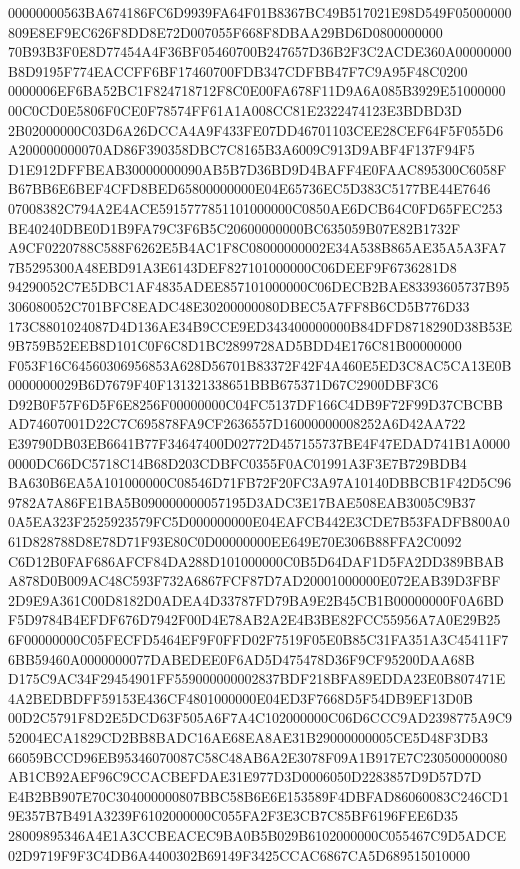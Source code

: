 \documentclass[UTF8,fontset=fandol,zihao=-4,a4paper]{ctexart}
\begin{document}
{{00000000563BA674186FC6D9939FA64F01B8367BC49B517021E98D549F05000000809E8EF9EC626F8DD8E72D007055F668F8DBAA29BD6D0800000000
70B93B3F0E8D77454A4F36BF05460700B247657D36B2F3C2ACDE360A00000000B8D9195F774EACCFF6BF17460700FDB347CDFBB47F7C9A95F48C0200
0000006EF6BA52BC1F824718712F8C0E00FA678F11D9A6A085B3929E5100000000C0CD0E5806F0CE0F78574FF61A1A008CC81E2322474123E3BDBD3D
2B02000000C03D6A26DCCA4A9F433FE07DD46701103CEE28CEF64F5F055D6A200000000070AD86F390358DBC7C8165B3A6009C913D9ABF4F137F94F5
D1E912DFFBEAB30000000090AB5B7D36BD9D4BAFF4E0FAAC895300C6058FB67BB6E6BEF4CFD8BED65800000000E04E65736EC5D383C5177BE44E7646
07008382C794A2E4ACE5915777851101000000C0850AE6DCB64C0FD65FEC253BE40240DBE0D1B9FA79C3F6B5C20600000000BC635059B07E82B1732F
A9CF0220788C588F6262E5B4AC1F8C08000000002E34A538B865AE35A5A3FA77B5295300A48EBD91A3E6143DEF827101000000C06DEEF9F6736281D8
94290052C7E5DBC1AF4835ADEE857101000000C06DECB2BAE83393605737B95306080052C701BFC8EADC48E30200000080DBEC5A7FF8B6CD5B776D33
173C8801024087D4D136AE34B9CCE9ED343400000000B84DFD8718290D38B53E9B759B52EEB8D101C0F6C8D1BC2899728AD5BDD4E176C81B00000000
F053F16C64560306956853A628D56701B83372F42F4A460E5ED3C8AC5CA13E0B0000000029B6D7679F40F131321338651BBB675371D67C2900DBF3C6
D92B0F57F6D5F6E8256F00000000C04FC5137DF166C4DB9F72F99D37CBCBBAD74607001D22C7C695878FA9CF2636557D16000000008252A6D42AA722
E39790DB03EB6641B77F34647400D02772D457155737BE4F47EDAD741B1A00000000DC66DC5718C14B68D203CDBFC0355F0AC01991A3F3E7B729BDB4
BA630B6EA5A101000000C08546D71FB72F20FC3A97A10140DBBCB1F42D5C969782A7A86FE1BA5B090000000057195D3ADC3E17BAE508EAB3005C9B37
0A5EA323F2525923579FC5D000000000E04EAFCB442E3CDE7B53FADFB800A061D828788D8E78D71F93E80C0D00000000EE649E70E306B88FFA2C0092
C6D12B0FAF686AFCF84DA288D101000000C0B5D64DAF1D5FA2DD389BBABA878D0B009AC48C593F732A6867FCF87D7AD20001000000E072EAB39D3FBF
2D9E9A361C00D8182D0ADEA4D33787FD79BA9E2B45CB1B00000000F0A6BDF5D9784B4EFDF676D7942F00D4E78AB2A2E4B3BE82FCC55956A7A0E29B25
6F00000000C05FECFD5464EF9F0FFD02F7519F05E0B85C31FA351A3C45411F76BB59460A0000000077DABEDEE0F6AD5D475478D36F9CF95200DAA68B
D175C9AC34F29454901FF559000000002837BDF218BFA89EDDA23E0B807471E4A2BEDBDFF59153E436CF4801000000E04ED3F7668D5F54DB9EF13D0B
00D2C5791F8D2E5DCD63F505A6F7A4C102000000C06D6CCC9AD2398775A9C952004ECA1829CD2BB8BADC16AE68EA8AE31B29000000005CE5D48F3DB3
66059BCCD96EB95346070087C58C48AB6A2E3078F09A1B917E7C230500000080AB1CB92AEF96C9CCACBEFDAE31E977D3D0006050D2283857D9D57D7D
E4B2BB907E70C304000000807BBC58B6E6E153589F4DBFAD86060083C246CD19E357B7B491A3239F6102000000C055FA2F3E3CB7C85BF6196FEE6D35
28009895346A4E1A3CCBEACEC9BA0B5B029B6102000000C055467C9D5ADCE02D9719F9F3C4DB6A4400302B69149F3425CCAC6867CA5D689515010000
}}
\end{document}
